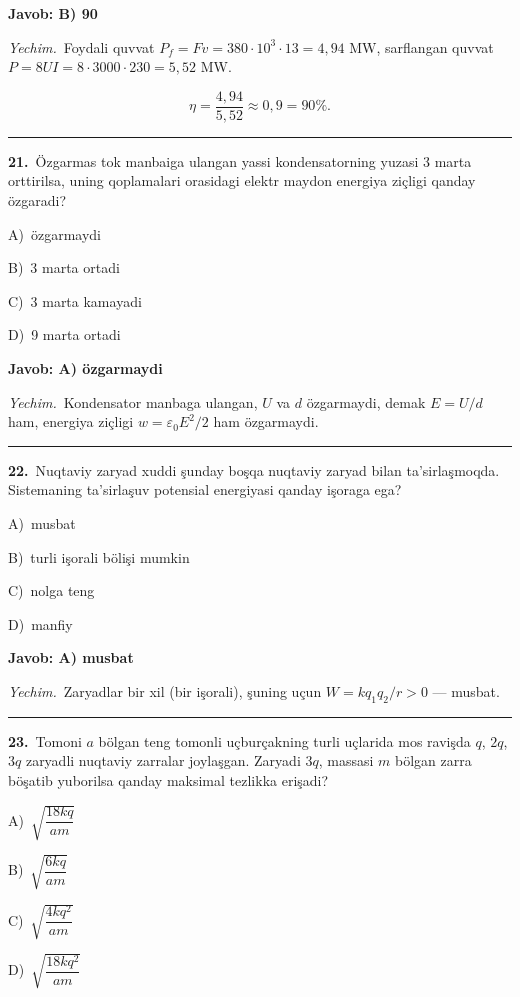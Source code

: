 \documentclass[11pt,a4paper]{article}
\newcommand{\opt}[2]{\hspace*{4mm}#1)\ #2\par}
\begin{document}
\noindent\colorbox{gray!12}{\parbox{\dimexpr\linewidth-2\fboxsep}{\textbf{Javob: B) 90}}}\par\smallskip
\noindent\textit{Yechim.}\ Foydali quvvat $P_f=Fv=380\cdot10^3\cdot13=4{,}94$ MW, sarflangan quvvat $P=8UI=8\cdot3000\cdot230=5{,}52$ MW.\par
\[\eta=\frac{4{,}94}{5{,}52}\approx0{,}9=90\%.\]\par\medskip\hrule\medskip
{}\noindent\begin{minipage}{\linewidth}
\textbf{21.}\ Özgarmas tok manbaiga ulangan yassi kondensatorning yuzasi 3 marta orttirilsa, uning qoplamalari orasidagi elektr maydon energiya ziçligi qanday özgaradi?\par\smallskip
\opt{A}{özgarmaydi}
\opt{B}{3 marta ortadi}
\opt{C}{3 marta kamayadi}
\opt{D}{9 marta ortadi}
\end{minipage}\vspace{2pt}\par
\noindent\colorbox{gray!12}{\parbox{\dimexpr\linewidth-2\fboxsep}{\textbf{Javob: A) özgarmaydi}}}\par\smallskip
\noindent\textit{Yechim.}\ Kondensator manbaga ulangan, $U$ va $d$ özgarmaydi, demak $E=U/d$ ham, energiya ziçligi $w=\varepsilon_0E^2/2$ ham özgarmaydi.\par\par\medskip\hrule\medskip
{}\noindent\begin{minipage}{\linewidth}
\textbf{22.}\ Nuqtaviy zaryad xuddi şunday boşqa nuqtaviy zaryad bilan ta’sirlaşmoqda. Sistemaning ta’sirlaşuv potensial energiyasi qanday işoraga ega?\par\smallskip
\opt{A}{musbat}
\opt{B}{turli işorali bölişi mumkin}
\opt{C}{nolga teng}
\opt{D}{manfiy}
\end{minipage}\vspace{2pt}\par
\noindent\colorbox{gray!12}{\parbox{\dimexpr\linewidth-2\fboxsep}{\textbf{Javob: A) musbat}}}\par\smallskip
\noindent\textit{Yechim.}\ Zaryadlar bir xil (bir işorali), şuning uçun $W=kq_1q_2/r>0$ — musbat.\par\par\medskip\hrule\medskip
{}\noindent\begin{minipage}{\linewidth}
\textbf{23.}\ Tomoni $a$ bölgan teng tomonli uçburçakning turli uçlarida mos ravişda $q$, $2q$, $3q$ zaryadli nuqtaviy zarralar joylaşgan. Zaryadi $3q$, massasi $m$ bölgan zarra böşatib yuborilsa qanday maksimal tezlikka erişadi?\par\smallskip
\opt{A}{$\sqrt{\dfrac{18kq}{am}}$}
\opt{B}{$\sqrt{\dfrac{6kq}{am}}$}
\opt{C}{$\sqrt{\dfrac{4kq^2}{am}}$}
\opt{D}{$\sqrt{\dfrac{18kq^2}{am}}$}
\end{minipage}\vspace{2pt}\par
\end{document}
